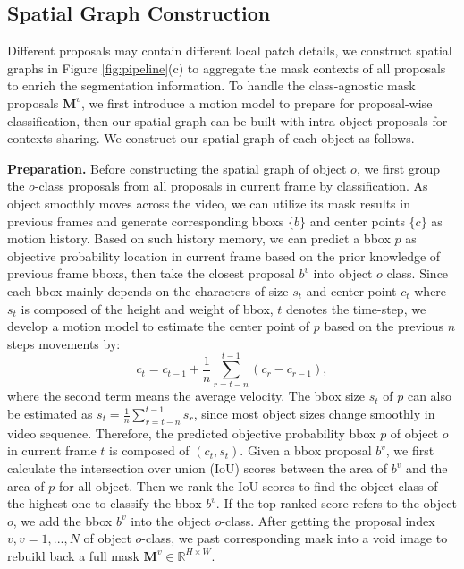 \documentclass[letterpaper]{article} %
\begin{document}
\subsection{Spatial Graph Construction}
Different proposals may contain different local patch details, we construct spatial graphs in Figure \ref{fig:pipeline}(c) to aggregate the mask contexts of all proposals to enrich the segmentation information. To handle the class-agnostic mask proposals $\bm{M}^v$, we first introduce a motion model to prepare for proposal-wise classification, then our spatial graph can be built with intra-object proposals for contexts sharing. We construct our spatial graph of each object as follows.

\noindent \textbf{Preparation.}
Before constructing the spatial graph of object $o$, we first group the $o$-class proposals from all proposals in current frame by classification.
As object smoothly moves across the video, we can utilize its mask results in previous frames and generate corresponding bboxs $\{b\}$ and center points $\{c\}$ as motion history. Based on such history memory, we can predict a bbox $p$ as objective probability location in current frame based on the prior knowledge of previous frame bboxs, then take the closest proposal $b^v$ into object $o$ class.
Since each bbox mainly depends on the characters of size $s_{t}$ and center point $c_{t}$ where $s_{t}$ is composed of the height and weight of bbox, $t$ denotes the time-step, we develop a motion model to estimate the center point of $p$ based on the previous $n$ steps movements by:
\begin{equation}
    c_{t} = c_{t-1} + \frac{1}{n}\sum_{r=t-n}^{t-1}(c_{r}-c_{r-1}),
\end{equation}
where the second term means the average velocity. The bbox size $s_{t}$ of $p$ can also be estimated as $s_{t}=\frac{1}{n}\sum_{r=t-n}^{t-1}s_r$, since most object sizes change smoothly in video sequence. Therefore, the predicted objective probability bbox $p$ of object $o$ in current frame $t$ is composed of $(c_{t},s_{t})$.
Given a bbox proposal $b^v$, we first calculate the intersection over union (IoU) scores between the area of $b^v$ and the area of $p$ for all object. Then we rank the IoU scores to find the object class of the highest one to classify the bbox $b^v$.
If the top ranked score refers to the object $o$, we add the bbox $b^v$ into the object $o$-class.
After getting the proposal index $v,v=1,...,N$ of object $o$-class, we past corresponding mask into a void image to rebuild back a full mask $\bm{M}^v \in \mathbb{R}^{H\times W}$.
\end{document}

